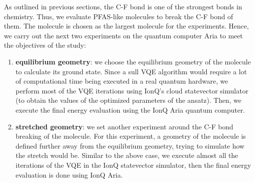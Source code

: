 \documentclass[journal,onecolumn]{IEEEtran}
\begin{document}
As outlined in previous sections, the C-F bond is one of the strongest bonds in chemistry. Thus, we evaluate PFAS-like molecules to break the C-F bond of them. 
The  molecule is chosen as the largest molecule for the experiments. 
Hence, we carry out the next two experiments on the quantum computer Aria to meet the objectives of the study:
%
\begin{enumerate}

    \item \textbf{ equilibrium geometry}: we choose the equilibrium geometry of the  molecule to calculate its ground state. 
    Since a sull VQE algorithm would require a lot of computational time being executed in a real quantum hardware, we perform most of the VQE iterations using IonQ's cloud statevector simulator\cite{noauthor_undated-uy} (to obtain the values of the optimized parameters of the ansatz).
    Then, we execute the final energy evaluation using the IonQ Aria quantum computer.
    \item \textbf{ stretched geometry}: we set another experiment around the C-F bond breaking of the  molecule. For this experiment, a geometry of the molecule is defined further away from the equilibrium geometry, trying to simulate how the stretch would be. 
    Similar to the above case, we execute almost all the iterations of the VQE in the IonQ statevector simulator, then the final energy evaluation is done using IonQ Aria.
\end{enumerate}

\end{document}
